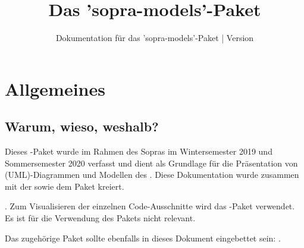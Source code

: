 \documentclass{sopra-base}
\title{Das 'sopra-models'-Paket}
\subtitle[Dokumentation für das 'sopra-models'-Paket]{Dokumentation für das 'sopra-models'-Paket | Version \thesomversion}
\begin{document}
    \maketitle

%
%

\section{Allgemeines}
\subsection{Warum, wieso, weshalb?}
    Dieses \LaTeXe-Paket wurde im Rahmen des Sopras im
    Wintersemester 2019 und Sommersemester 2020 verfasst und dient als
    Grundlage für die Präsentation von (UML)-Diagrammen und Modellen
    des . Diese Dokumentation wurde zusammen mit der
     sowie dem Paket  kreiert.\par
    .\newline
    Zum Visualisieren der einzelnen Code-Ausschnitte wird das
    -Paket verwendet. Es ist für die Verwendung des Pakets nicht relevant.\par
    Das zugehörige Paket sollte ebenfalls in dieses Dokument eingebettet sein: .
\end{document}
